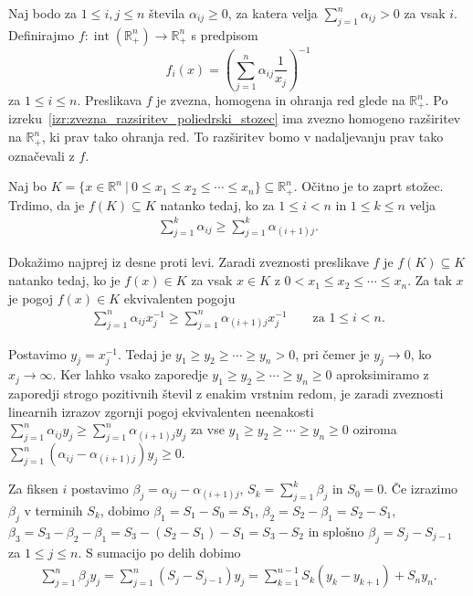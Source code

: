 \documentclass[mat2, tisk]{fmfdelo}
\newcommand{\R}{\mathbb{R}}
\begin{document}
\begin{zgled}\label{zgled:harmonicna_preslikava}
  Naj bodo za $1\leq i,j\leq n$ števila $\alpha_{ij}\geq0$, za katera
  velja $\sum\limits_{j=1}^n\alpha_{ij}>0$ za vsak $i$. Definirajmo
  $f\colon\operatorname{int}(\R_+^n)\longrightarrow\R_+^n$ s predpisom
  \[f_i(x)=\left(\sum\limits_{j=1}^n\alpha_{ij} \frac{1}{x_j}\right)^{-1}\] za
  $1\leq i\leq n$. Preslikava $f$ je zvezna, homogena in ohranja red glede
  na $\R_+^n$. Po
  izreku~\ref{izr:zvezna_razsiritev_poliedrski_stozec}
  ima zvezno homogeno razširitev na $\R_+^n$, ki prav tako
  ohranja red. To razširitev bomo v nadaljevanju prav tako
  označevali z $f$.

  Naj bo
  $K=\{x\in\R^n ~|~ 0\leq x_1\leq x_2\leq\cdots\leq x_n\} \subseteq \R_+^n$. Očitno je to zaprt stožec.
  Trdimo, da je $f(K)\subseteq K$ natanko tedaj, ko za
  $1\leq i<n$ in $1\leq k\leq n$ velja
  \begin{align}
  \sum\limits_{j=1}^k\alpha_{ij}
  \geq
  \sum\limits_{j=1}^k\alpha_{(i+1)j}.
  \label{eq:4.3}
  \end{align}

  Dokažimo najprej iz desne proti levi. Zaradi zveznosti preslikave $f$ je $f(K)\subseteq K$ natanko tedaj,
  ko je $f(x)\in K$ za vsak $x\in K$ z
  $0<x_1\leq x_2\leq\cdots\leq x_n$. Za tak $x$ je pogoj
  $f(x)\in K$ ekvivalenten pogoju
  \begin{align}
  \sum\limits_{j=1}^n\alpha_{ij}x_j^{-1}
  \geq
  \sum\limits_{j=1}^n\alpha_{(i+1)j}x_j^{-1}
  \qquad
  \text{za }1\leq i<n.
  \label{eq:4.4}
  \end{align}

  Postavimo $y_j=x_j^{-1}$. Tedaj je
  $y_1\geq y_2\geq\cdots\geq y_n>0$, pri čemer je $y_j\to0$, ko
  $x_j\to\infty$. Ker lahko vsako zaporedje
  $y_1\geq y_2\geq\cdots\geq y_n\geq0$
  aproksimiramo z zaporedji strogo pozitivnih števil
  z enakim vrstnim redom, je zaradi zveznosti
  linearnih izrazov zgornji pogoj ekvivalenten neenakosti
  $\sum\limits_{j=1}^n\alpha_{ij}y_j
  \geq\sum\limits_{j=1}^n\alpha_{(i+1)j}y_j$
  za vse $y_1\geq y_2\geq\cdots\geq y_n\geq0$ 
  oziroma $\sum\limits_{j=1}^n(\alpha_{ij}-\alpha_{(i+1)j})y_j
  \geq 0$.

  Za fiksen $i$ postavimo
  $\beta_j=\alpha_{ij}-\alpha_{(i+1)j}$,
  $S_k=\sum\limits_{j=1}^k\beta_j$ in $S_0=0$.
  Če izrazimo $\beta_j$ v terminih $S_k$, dobimo
  $\beta_1=S_1-S_0 = S_1$, $\beta_2=S_2-\beta_1=S_2-S_1$, 
  $\beta_3= S_3 - \beta_2 - \beta_1 = S_3 - (S_2-S_1) - S_1 = S_3 - S_2$ in 
  splošno $\beta_j=S_j-S_{j-1}$ za $1\leq j\leq n$.
  S sumacijo po delih dobimo
  \begin{align*}
  \sum\limits_{j=1}^n\beta_j y_j
  = \sum\limits_{j=1}^n (S_j-S_{j-1}) y_j
  =\sum\limits_{k=1}^{n-1}S_k(y_k-y_{k+1})+S_n y_n.
  \end{align*}


\end{zgled}
\end{document}
